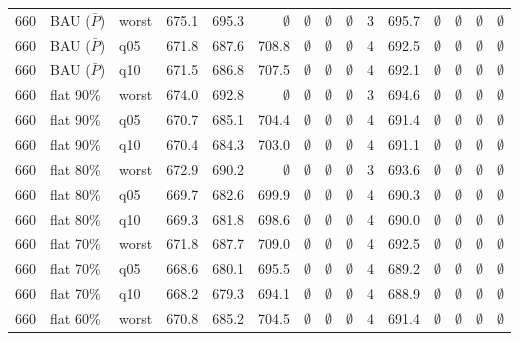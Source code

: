 \begin{longtable}{lllrrrrrrlrrrrr}
660 & BAU ($\bar P$) & worst & 675.1 & 695.3 & $\emptyset$ & $\emptyset$ & $\emptyset$ & $\emptyset$ & 3 & 695.7 & $\emptyset$ & $\emptyset$ & $\emptyset$ & $\emptyset$ \\
660 & BAU ($\bar P$) & q05 & 671.8 & 687.6 & 708.8 & $\emptyset$ & $\emptyset$ & $\emptyset$ & 4 & 692.5 & $\emptyset$ & $\emptyset$ & $\emptyset$ & $\emptyset$ \\
660 & BAU ($\bar P$) & q10 & 671.5 & 686.8 & 707.5 & $\emptyset$ & $\emptyset$ & $\emptyset$ & 4 & 692.1 & $\emptyset$ & $\emptyset$ & $\emptyset$ & $\emptyset$ \\
660 & flat 90\% & worst & 674.0 & 692.8 & $\emptyset$ & $\emptyset$ & $\emptyset$ & $\emptyset$ & 3 & 694.6 & $\emptyset$ & $\emptyset$ & $\emptyset$ & $\emptyset$ \\
660 & flat 90\% & q05 & 670.7 & 685.1 & 704.4 & $\emptyset$ & $\emptyset$ & $\emptyset$ & 4 & 691.4 & $\emptyset$ & $\emptyset$ & $\emptyset$ & $\emptyset$ \\
660 & flat 90\% & q10 & 670.4 & 684.3 & 703.0 & $\emptyset$ & $\emptyset$ & $\emptyset$ & 4 & 691.1 & $\emptyset$ & $\emptyset$ & $\emptyset$ & $\emptyset$ \\
660 & flat 80\% & worst & 672.9 & 690.2 & $\emptyset$ & $\emptyset$ & $\emptyset$ & $\emptyset$ & 3 & 693.6 & $\emptyset$ & $\emptyset$ & $\emptyset$ & $\emptyset$ \\
660 & flat 80\% & q05 & 669.7 & 682.6 & 699.9 & $\emptyset$ & $\emptyset$ & $\emptyset$ & 4 & 690.3 & $\emptyset$ & $\emptyset$ & $\emptyset$ & $\emptyset$ \\
660 & flat 80\% & q10 & 669.3 & 681.8 & 698.6 & $\emptyset$ & $\emptyset$ & $\emptyset$ & 4 & 690.0 & $\emptyset$ & $\emptyset$ & $\emptyset$ & $\emptyset$ \\
660 & flat 70\% & worst & 671.8 & 687.7 & 709.0 & $\emptyset$ & $\emptyset$ & $\emptyset$ & 4 & 692.5 & $\emptyset$ & $\emptyset$ & $\emptyset$ & $\emptyset$ \\
660 & flat 70\% & q05 & 668.6 & 680.1 & 695.5 & $\emptyset$ & $\emptyset$ & $\emptyset$ & 4 & 689.2 & $\emptyset$ & $\emptyset$ & $\emptyset$ & $\emptyset$ \\
660 & flat 70\% & q10 & 668.2 & 679.3 & 694.1 & $\emptyset$ & $\emptyset$ & $\emptyset$ & 4 & 688.9 & $\emptyset$ & $\emptyset$ & $\emptyset$ & $\emptyset$ \\
660 & flat 60\% & worst & 670.8 & 685.2 & 704.5 & $\emptyset$ & $\emptyset$ & $\emptyset$ & 4 & 691.4 & $\emptyset$ & $\emptyset$ & $\emptyset$ & $\emptyset$ \\

\end{longtable}
